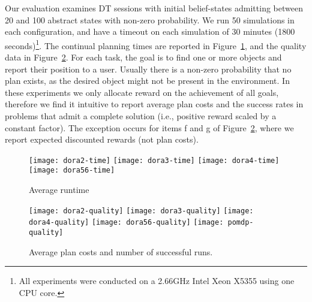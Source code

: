 
Our evaluation examines DT sessions with initial belief-states
admitting between 20 and 100 abstract states with non-zero
probability. We run 50 simulations in each configuration, and have a
timeout on each simulation of 30 minutes (1800 seconds)\footnote{All
experiments were conducted on a 2.66GHz Intel Xeon X5355 using one CPU
core.}. The continual planning times are reported in
Figure~\ref{fig:results-time}, and the quality data in
Figure~\ref{fig:results-quality}.
For each task, the goal is to find one or more objects and report
their position to a user. Usually there is a non-zero probability that
no plan exists, as the desired object might not be present in the
environment.
In these experiments we only allocate reward on the achievement of all
goals, therefore we find it intuitive to report average plan costs and
the success rates in problems that admit a complete solution (i.e.,
positive reward scaled by a constant factor). The exception occurs for
items f and g of Figure~\ref{fig:results-quality}, where we report
expected discounted rewards (not plan costs).

\begin{figure}[h!]
  \texttt{[image: dora2-time]}\hfill
  \texttt{[image: dora3-time]}\hfill
  \texttt{[image: dora4-time]}\hfill
  \vspace{2mm}
  \texttt{[image: dora56-time]}\hfill
  \caption{Average runtime}
  \label{fig:results-time}
\end{figure}

\begin{figure}[h!]
  \texttt{[image: dora2-quality]}\hfill
  \texttt{[image: dora3-quality]}\hfill
  \texttt{[image: dora4-quality]}\hfill
  \vspace{2mm}
  \texttt{[image: dora56-quality]}\hfill
  \vspace{2mm}
  \texttt{[image: pomdp-quality]}\hfill
  \caption{Average plan costs and number of successful runs.}
  \label{fig:results-quality}
\end{figure}

